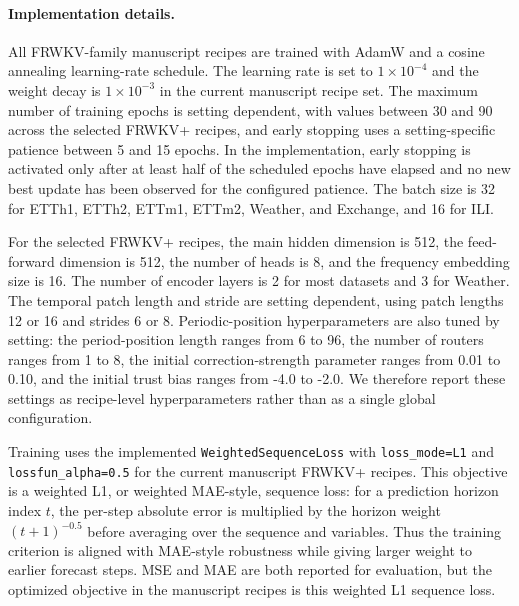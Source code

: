 \documentclass[a4paper,fleqn]{cas-sc}
\begin{document}
\paragraph{Implementation details.}
All FRWKV-family manuscript recipes are trained with AdamW and a cosine annealing learning-rate schedule. The learning rate is set to $1\times 10^{-4}$ and the weight decay is $1\times 10^{-3}$ in the current manuscript recipe set. The maximum number of training epochs is setting dependent, with values between 30 and 90 across the selected FRWKV+ recipes, and early stopping uses a setting-specific patience between 5 and 15 epochs. In the implementation, early stopping is activated only after at least half of the scheduled epochs have elapsed and no new best update has been observed for the configured patience. The batch size is 32 for ETTh1, ETTh2, ETTm1, ETTm2, Weather, and Exchange, and 16 for ILI.

For the selected FRWKV+ recipes, the main hidden dimension is 512, the feed-forward dimension is 512, the number of heads is 8, and the frequency embedding size is 16. The number of encoder layers is 2 for most datasets and 3 for Weather. The temporal patch length and stride are setting dependent, using patch lengths 12 or 16 and strides 6 or 8. Periodic-position hyperparameters are also tuned by setting: the period-position length ranges from 6 to 96, the number of routers ranges from 1 to 8, the initial correction-strength parameter ranges from 0.01 to 0.10, and the initial trust bias ranges from -4.0 to -2.0. We therefore report these settings as recipe-level hyperparameters rather than as a single global configuration.

Training uses the implemented \texttt{WeightedSequenceLoss} with \texttt{loss\_mode=L1} and \texttt{lossfun\_alpha=0.5} for the current manuscript FRWKV+ recipes. This objective is a weighted L1, or weighted MAE-style, sequence loss: for a prediction horizon index $t$, the per-step absolute error is multiplied by the horizon weight $(t+1)^{-0.5}$ before averaging over the sequence and variables. Thus the training criterion is aligned with MAE-style robustness while giving larger weight to earlier forecast steps. MSE and MAE are both reported for evaluation, but the optimized objective in the manuscript recipes is this weighted L1 sequence loss.
\end{document}
